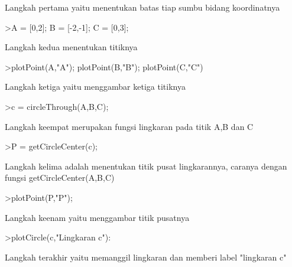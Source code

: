 \documentclass[a4paper,10pt]{article}
\begin{document}
\begin{eulernotebook}
\begin{eulercomment}
\begin{eulercomment}
\begin{eulerprompt}
\end{eulerprompt}
\begin{eulercomment}
Langkah pertama yaitu menentukan batas tiap sumbu bidang koordinatnya
\end{eulercomment}
\begin{eulerprompt}
>A = [0,2]; B = [-2,-1]; C = [0,3];
\end{eulerprompt}
\begin{eulercomment}
Langkah kedua menentukan titiknya
\end{eulercomment}
\begin{eulerprompt}
>plotPoint(A,"A"); plotPoint(B,"B"); plotPoint(C,"C")
\end{eulerprompt}
\begin{eulercomment}
Langkah ketiga yaitu menggambar ketiga titiknya
\end{eulercomment}
\begin{eulerprompt}
>c = circleThrough(A,B,C);
\end{eulerprompt}
\begin{eulercomment}
Langkah keempat merupakan fungsi lingkaran pada titik A,B dan C
\end{eulercomment}
\begin{eulerprompt}
>P = getCircleCenter(c);
\end{eulerprompt}
\begin{eulercomment}
Langkah kelima adalah menentukan titik pusat lingkarannya, caranya
dengan fungsi getCircleCenter(A,B,C)
\end{eulercomment}
\begin{eulerprompt}
>plotPoint(P,"P"); 
\end{eulerprompt}
\begin{eulercomment}
Langkah keenam yaitu menggambar titik pusatnya
\end{eulercomment}
\begin{eulerprompt}
>plotCircle(c,"Lingkaran c"):
\end{eulerprompt}
\begin{eulercomment}
Langkah terakhir yaitu memanggil lingkaran dan memberi label
"lingkaran c"


\end{eulercomment}
\end{eulercomment}
\end{eulercomment}
\end{eulernotebook}
\end{document}
